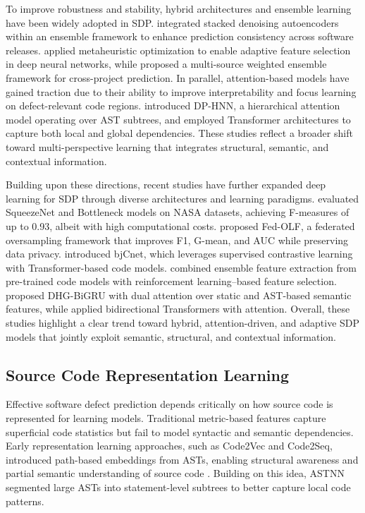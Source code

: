 \documentclass[authoryear,final,5p,times,twocolumn]{elsarticle}
\theoremstyle{plain}
\begin{document}
To improve robustness and stability, hybrid architectures and ensemble learning have been widely adopted in SDP. \citet{tong2018software} integrated stacked denoising autoencoders within an ensemble framework to enhance prediction consistency across software releases. \citet{zhao2021metaheuristic} applied metaheuristic optimization to enable adaptive feature selection in deep neural networks, while \citet{tong2024master} proposed a multi-source weighted ensemble framework for cross-project prediction. In parallel, attention-based models have gained traction due to their ability to improve interpretability and focus learning on defect-relevant code regions. \citet{yu2021hierarchical} introduced DP-HNN, a hierarchical attention model operating over AST subtrees, and \citet{zheng2021software} employed Transformer architectures to capture both local and global dependencies. These studies reflect a broader shift toward multi-perspective learning that integrates structural, semantic, and contextual information.

Building upon these directions, recent studies have further expanded deep learning for SDP through diverse architectures and learning paradigms. \citet{pandey2025deep} evaluated SqueezeNet and Bottleneck models on NASA datasets, achieving F-measures of up to 0.93, albeit with high computational costs. \citet{hu2025fed} proposed Fed-OLF, a federated oversampling framework that improves F1, G-mean, and AUC while preserving data privacy. \citet{han2024bjcnet} introduced bjCnet, which leverages supervised contrastive learning with Transformer-based code models. \citet{hesamolhokama2024sdperl} combined ensemble feature extraction from pre-trained code models with reinforcement learning–based feature selection. \citet{malhotra2025dhg} proposed DHG-BiGRU with dual attention over static and AST-based semantic features, while \citet{nashaat2025refining} applied bidirectional Transformers with attention. Overall, these studies highlight a clear trend toward hybrid, attention-driven, and adaptive SDP models that jointly exploit semantic, structural, and contextual information.

\subsection{Source Code Representation Learning}
Effective software defect prediction depends critically on how source code is represented for learning models. Traditional metric-based features capture superficial code statistics but fail to model syntactic and semantic dependencies. Early representation learning approaches, such as Code2Vec and Code2Seq, introduced path-based embeddings from ASTs, enabling structural awareness and partial semantic understanding of source code \citep{alon2019code2vec, alon2019code2seq}. Building on this idea, ASTNN \citep{zhang2019astnn} segmented large ASTs into statement-level subtrees to better capture local code patterns.
\end{document}
